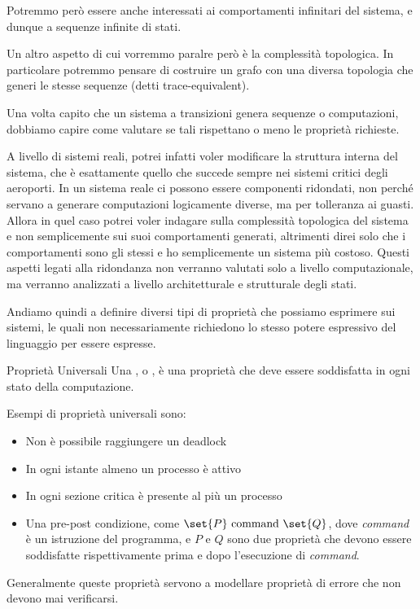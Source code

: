 Potremmo però essere anche interessati ai comportamenti infinitari del sistema, e dunque a sequenze infinite di stati.

Un altro aspetto di cui vorremmo paralre però è la complessità topologica. In particolare potremmo pensare di costruire un grafo con una diversa topologia che generi le stesse sequenze (detti trace-equivalent).

Una volta capito che un sistema a transizioni genera sequenze o computazioni, dobbiamo capire come valutare se tali rispettano o meno le proprietà richieste.

A livello di sistemi reali, potrei infatti voler modificare la struttura interna del sistema, che è esattamente quello che succede sempre nei sistemi critici degli aeroporti.
In un sistema reale ci possono essere componenti ridondati, non perché servano a generare computazioni logicamente diverse, ma per tolleranza ai guasti. Allora in quel caso potrei voler indagare sulla complessità topologica del sistema e non semplicemente sui suoi comportamenti generati, altrimenti direi solo che i comportamenti sono gli stessi e ho semplicemente un sistema più costoso. Questi aspetti legati alla ridondanza non verranno valutati solo a livello computazionale, ma verranno analizzati a livello architetturale e strutturale degli stati.

Andiamo quindi a definire diversi tipi di proprietà che possiamo esprimere sui sistemi, le quali non necessariamente richiedono lo stesso potere espressivo del linguaggio per essere espresse.

\begin{definition}{Proprietà Universali}
  Una , o , è una proprietà che deve essere soddisfatta in ogni stato della computazione.
\end{definition}

\begin{example}{}
  Esempi di proprietà universali sono:
  \begin{itemize}
    \item Non è possibile raggiungere un deadlock
    \item In ogni istante almeno un processo è attivo
    \item In ogni sezione critica è presente al più un processo
    \item Una pre-post condizione, come \(\set{P} \text{ command } \set{Q}\), dove \textit{command} è un istruzione del programma, e \(P\) e \(Q\) sono due proprietà che devono essere soddisfatte rispettivamente prima e dopo l'esecuzione di \textit{command}.
  \end{itemize}

  Generalmente queste proprietà servono a modellare proprietà di errore che non devono mai verificarsi.
\end{example}

